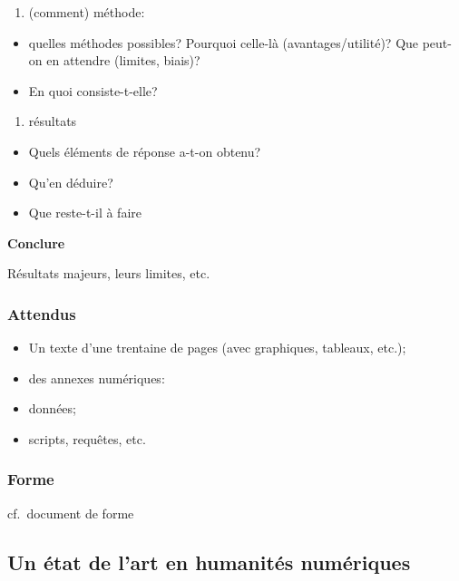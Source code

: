 \documentclass[a4paper,twoside,12pt]{book}
\begin{document}
\begin{enumerate}
	\def\labelenumi{\arabic{enumi}.}
	\setcounter{enumi}{1}
	\item
	(comment) méthode:
\end{enumerate}

\begin{itemize}
	\item
	quelles méthodes possibles? Pourquoi celle-là (avantages/utilité)? Que
	peut-on en attendre (limites, biais)?
	\item
	En quoi consiste-t-elle?
\end{itemize}

\begin{enumerate}
	\def\labelenumi{\arabic{enumi}.}
	\setcounter{enumi}{2}
	\item
	résultats
\end{enumerate}

\begin{itemize}
	\item
	Quels éléments de réponse a-t-on obtenu?
	\item
	Qu'en déduire?
	\item
	Que reste-t-il à faire
\end{itemize}

\textbf{Conclure}

Résultats majeurs, leurs limites, etc.

\subsubsection{Attendus}\label{attendus}

\begin{itemize}
	\item
	Un texte d'une trentaine de pages (avec graphiques, tableaux, etc.);
	\item
	des annexes numériques:
	\item
	données;
	\item
	scripts, requêtes, etc.
\end{itemize}

\subsubsection{Forme}\label{forme}

cf.~document de forme

\subsection{Un état de l'art en humanités numériques}
\end{document}

